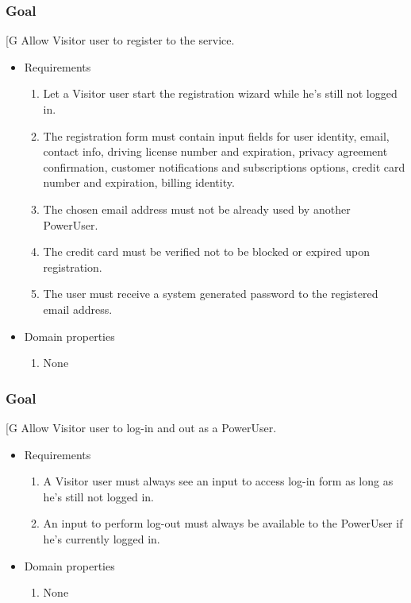     \subsubsection{Goal }
    {[}G\arabic{goalctr}{]}
    Allow Visitor user to register to the service.
    \begin{itemize}
        \item Requirements
        \begin{enumerate}[REQ]
    		\item Let a Visitor user start the registration wizard while he's still not logged in.
			\item The registration form must contain input fields for user identity, email, contact info, driving license number and expiration, privacy agreement confirmation, customer notifications and subscriptions options, credit card number and expiration, billing identity.
			\item The chosen email address must not be already used by another PowerUser.
			\item The credit card must be verified not to be blocked or expired upon registration.
			\item The user must receive a system generated password to the registered email address.
        \end{enumerate}
        \item Domain properties
        \begin{enumerate}[PRO]
    			\item None
        \end{enumerate}
    \end{itemize}

    \subsubsection{Goal }
    {[}G\arabic{goalctr}{]}
    Allow Visitor user to log-in and out as a PowerUser.
    \begin{itemize}
        \item Requirements
        \begin{enumerate}[REQ]
			\item A Visitor user must always see an input to access log-in form as long as he's still not logged in.
		    \item An input to perform log-out must always be available to the PowerUser if he's currently logged in.
        \end{enumerate}
        \item Domain properties
        \begin{enumerate}[PRO]
    			\item None
        \end{enumerate}
    \end{itemize}


